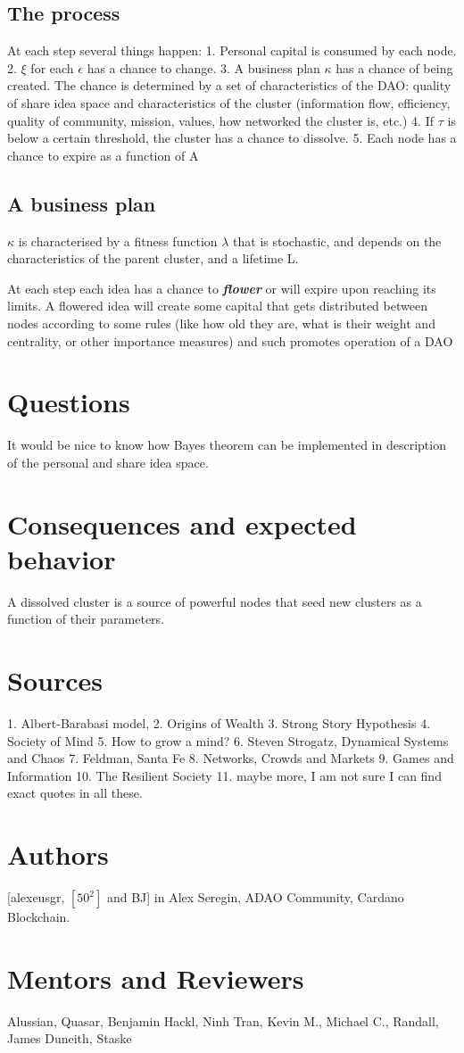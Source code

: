 \documentclass{article}
\begin{document}
\subsection{The process}
At each step several things happen:
1. Personal capital is consumed by each node. 
2. $\xi$ for each $\epsilon$ has a chance to change.
3. A business plan $\kappa$ has a chance of being created. The chance is determined by a set of characteristics of the DAO: quality of share idea space and characteristics of the cluster (information flow, efficiency, quality of community, mission, values, how networked the cluster is, etc.)
4. If $\tau$ is below a certain threshold, the cluster has a chance to dissolve.
5. Each node has a chance to expire as a function of A

\subsection{A business plan}
$\kappa$ is characterised by a fitness function $\lambda$ that is stochastic, and depends on the characteristics of the parent cluster, and a lifetime L.

At each step each idea has a chance to \textbf{\textit{flower}} or will expire upon reaching its limits.
A flowered idea will create some capital that gets distributed between nodes according to some rules (like how old they are, what is their weight and centrality, or other importance measures) and such promotes operation of a DAO

\section{Questions}
It would be nice to know how Bayes theorem can be implemented in description of the personal and share idea space.

\section{Consequences and expected behavior}
A dissolved cluster is a source of powerful nodes that seed new clusters as a function of their parameters.

\section{Sources}
1. Albert-Barabasi model, 
2. Origins of Wealth
3. Strong Story Hypothesis
4. Society of Mind
5. How to grow a mind?
6. Steven Strogatz, Dynamical Systems and Chaos
7. Feldman, Santa Fe
8. Networks, Crowds and Markets
9. Games and Information
10. The Resilient Society
11. maybe more, I am not sure I can find exact quotes in all these. 
\section{Authors}
[alexeusgr, $[50^2]$ and BJ] in Alex Seregin, ADAO Community, Cardano Blockchain. 
\section{Mentors and Reviewers}
Alussian, Quasar, Benjamin Hackl, Ninh Tran, Kevin M., Michael C., Randall, James Duneith, Staske 
\end{document}

